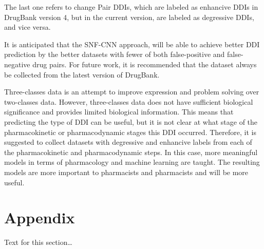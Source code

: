 \documentclass{bmcart}
\begin{document}
The last one refers to change Pair DDIs, which are labeled as enhancive DDIs in DrugBank version 4, but in the current version, are labeled as degressive DDIs, and vice versa.

It is anticipated that the SNF-CNN approach, will be able to achieve better DDI prediction by the better datasets with fewer of both false-positive and false-negative drug pairs. For future work, it is recommended that the dataset always be collected from the latest version of DrugBank.

Three-classes data is an attempt to improve expression and problem solving over two-classes data. However, three-classes data does not have sufficient biological significance and provides limited biological information. This means that predicting the type of DDI can be useful, but it is not clear at what stage of the pharmacokinetic or pharmacodynamic stages this DDI occurred. Therefore, it is suggested to collect datasets with degressive and enhancive labels from each of the pharmacokinetic and pharmacodynamic steps. In this case, more meaningful models in terms of pharmacology and machine learning are taught. The resulting models are more important to pharmacists and pharmacists and will be more useful.

\section*{Appendix}
Text for this section\ldots

\end{document}
